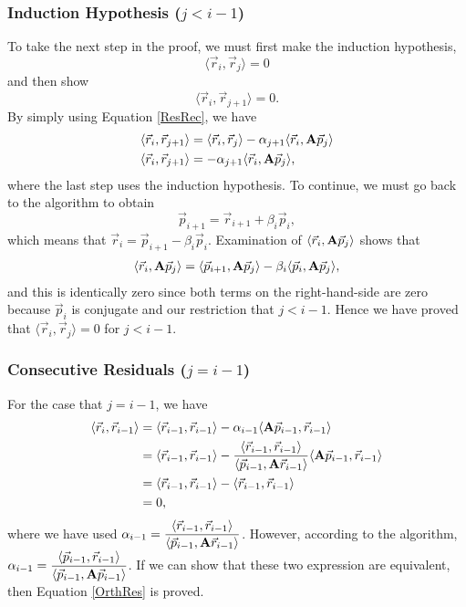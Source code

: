 \documentclass[11pt,letterpaper,oneside,notitlepage]{article}	%
\newcommand{\bfa}{{\bf A}}						%
\newcommand{\ip}[2]{\langle \vec #1,\vec #2 \rangle}	%
\newcommand{\aip}[2]{\langle \vec #1,\bfa\vec #2 \rangle}	%
\newcommand{\eq}[1]{Equation \eqref{#1}}		%
\newcommand{\pindent}[1]{\hspace{6mm}}  		%
\numberwithin{equation}{section}				%
\begin{document}
\subsubsection{Induction Hypothesis ($j<i-1$)}%
\pindent{}To take the next step in the proof, we must first make the induction hypothesis, 
\[
\ip{r_i}{r_j} = 0
\]
and then show 
\[
\ip{r_i}{r_{j+1}} = 0
.\]
By simply using \eq{ResRec}, we have
\begin{align*}
\ip{r_i}{r_{j+1}} &= \ip{r_i}{r_j} -\alpha_{j+1} \aip{r_i}{p_j} \\
\ip{r_i}{r_{j+1}} &= -\alpha_{j+1} \aip{r_i}{p_j}
,\end{align*}
where the last step uses the induction hypothesis. To continue, we must go back to the algorithm to obtain
\begin{equation}
\vec p_{i+1} = \vec r_{i+1} + \beta_i \vec p_i \label{Prec}	%
,\end{equation}
which means that $\vec r_i = \vec p_{i+1} - \beta_i \vec p_i$.
Examination of $\aip{r_i}{p_j}$ shows that
\begin{align*}
\aip{r_i}{p_j} = \aip{p_{i+1}}{p_j} - \beta_i \aip{p_i}{p_j}
,\end{align*}
and this is identically zero since both terms on the right-hand-side are zero because $\vec p_i$ is conjugate and our restriction that $j<i-1$. Hence we have proved that $\langle \vec r_i,\vec r_j \rangle = 0$ for $j<i-1$. 

\subsubsection{Consecutive Residuals ($j=i-1$)}%
\pindent{}For the case that $j=i-1$, we have
\begin{align*}
\ip{r_i}{r_{i-1}} &= \ip{r_{i-1}}{r_{i-1}} -\alpha_{i-1} \langle \bfa\vec p_{i-1}, \vec r_{i-1} \rangle \\
&= \ip{r_{i-1}}{r_{i-1}} -\frac{\ip{r_{i-1}}{r_{i-1}}}{\aip{p_{i-1}}{r_{i-1}}} \langle \bfa\vec p_{i-1}, \vec r_{i-1} \rangle \\
&= \ip{r_{i-1}}{r_{i-1}} - \ip{r_{i-1}}{r_{i-1}} \\
&= 0
,\end{align*}
where we have used $\alpha_{i-1}=\dfrac{\ip{r_{i-1}}{r_{i-1}}}{\aip{p_{i-1}}{r_{i-1}}}$. However, according to the algorithm, $\alpha_{i-1}=\dfrac{\ip{p_{i-1}}{r_{i-1}}}{\aip{p_{i-1}}{p_{i-1}}}$. If we can show that these two expression are equivalent, then \eq{OrthRes} is proved.
\end{document}
